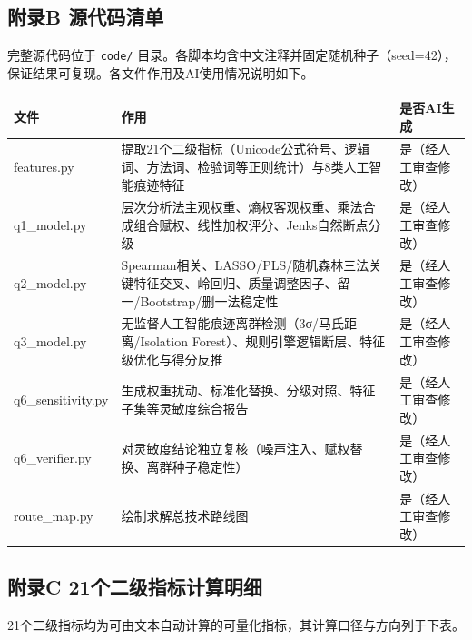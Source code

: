 \documentclass[withoutpreface]{cumcmthesis}
\begin{document}
\subsection{附录B 源代码清单}
完整源代码位于 \texttt{code/} 目录。各脚本均含中文注释并固定随机种子（seed=42），保证结果可复现。各文件作用及AI使用情况说明如下。

\begin{table}[htbp]
\centering
\small
\begin{tabularx}{\textwidth}{XXX}
\toprule
文件 & 作用 & 是否AI生成 \\
\midrule
features.py & 提取21个二级指标（Unicode公式符号、逻辑词、方法词、检验词等正则统计）与8类人工智能痕迹特征 & 是（经人工审查修改） \\
q1\_model.py & 层次分析法主观权重、熵权客观权重、乘法合成组合赋权、线性加权评分、Jenks自然断点分级 & 是（经人工审查修改） \\
q2\_model.py & Spearman相关、LASSO/PLS/随机森林三法关键特征交叉、岭回归、质量调整因子、留一/Bootstrap/删一法稳定性 & 是（经人工审查修改） \\
q3\_model.py & 无监督人工智能痕迹离群检测（3σ/马氏距离/Isolation Forest）、规则引擎逻辑断层、特征级优化与得分反推 & 是（经人工审查修改） \\
q6\_sensitivity.py & 生成权重扰动、标准化替换、分级对照、特征子集等灵敏度综合报告 & 是（经人工审查修改） \\
q6\_verifier.py & 对灵敏度结论独立复核（噪声注入、赋权替换、离群种子稳定性） & 是（经人工审查修改） \\
route\_map.py & 绘制求解总技术路线图 & 是（经人工审查修改） \\
\bottomrule
\end{tabularx}
\end{table}
\subsection{附录C 21个二级指标计算明细}
21个二级指标均为可由文本自动计算的可量化指标，其计算口径与方向列于下表。
\end{document}
